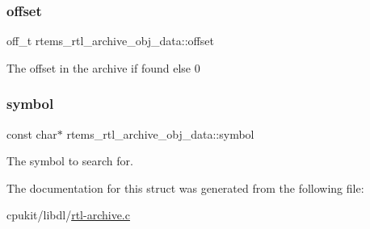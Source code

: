 \subsubsection{\texorpdfstring{offset}{offset}}
{\footnotesize\ttfamily off\+\_\+t rtems\+\_\+rtl\+\_\+archive\+\_\+obj\+\_\+data\+::offset}

The offset in the archive if found else 0 \mbox{\label{structrtems__rtl__archive__obj__data_ae132748440aea053c48ec0b2f7f26dcd}} 
\subsubsection{\texorpdfstring{symbol}{symbol}}
{\footnotesize\ttfamily const char$\ast$ rtems\+\_\+rtl\+\_\+archive\+\_\+obj\+\_\+data\+::symbol}

The symbol to search for. 

The documentation for this struct was generated from the following file\+:\begin{DoxyCompactItemize}
\item 
cpukit/libdl/\mbox{\hyperlink{rtl-archive_8c}{rtl-\/archive.\+c}}\end{DoxyCompactItemize}
